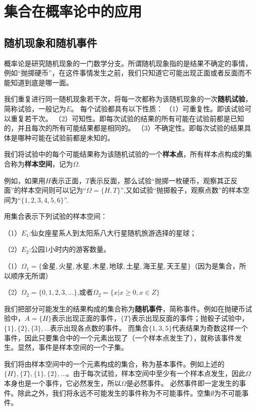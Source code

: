\section{集合在概率论中的应用}
\subsection{随机现象和随机事件}
概率论是研究随机现象的一门数学分支。所谓随机现象指的是结果不确定的事情，例如“抛掷硬币”，在这件事情发生之前，我们只知道它可能出现正面或者反面而不能知道到底是哪一面。

我们重复进行同一随机现象若干次，将每一次都称为该随机现象的一次\textbf{随机试验}，简称试验，一般记为$E$。
每个试验都具有以下性质：
（1）可重复性。即该试验可以重复若干次。
（2）可知性。即每次试验的结果的所有可能在试验前都是已知的，并且每次的所有可能结果都是相同的。
（3）不确定性。即每次试验的结果具体是哪种可能在试验前都是未知的。

我们将试验中的每个可能结果称为该随机试验的一个\textbf{样本点}，所有样本点构成的集合称为\textbf{样本空间}，记为$\Omega$.

例如，如果用$H$表示正面，$T$表示反面，那么试验“抛掷一枚硬币，观察其正反面”的样本空间则可以记为“$\Omega=\{H,T\}$”,又如试验“抛掷骰子，观察点数”的样本空间为“$\{1,2,3,4,5,6\}$”.

\begin{example}
    用集合表示下列试验的样本空间：
    
    （1）$E_1$:仙女座星系人到太阳系八大行星随机旅游选择的星球；

    （2）$E_2$:公园1小时内的游客数量。
\end{example}
\begin{solution}
    （1）$\Omega_1=\{金星,火星,水星,木星,地球,土星,海王星,天王星\}$（因为是集合，所以顺序无所谓）

    （2）$\Omega_2=\{0,1,2,3,...\}$,或者$\Omega_2=\{x|x \geq 0 , x \in Z\}$
\end{solution}

我们把部分可能发生的结果构成的集合称为\textbf{随机事件}，简称事件。例如在抛硬币试验中，$A=\{H\}$表示出现正面的事件，$\{T\}$表示出现反面的事件；抛骰子试验中，$\{1\},\{2\},\{3\},...$表示出现各点数的事件。
而集合$\{1,3,5\}$代表结果为奇数这样一个事件，因此只要集合中的一个元素出现了（一个样本点发生了），就称该事件发生。显然，事件是样本空间的一个子集。

我们将由样本空间中的一个元素构成的集合，称为基本事件。例如上述的$\{H\},\{T\},\{1\},\{2\},...$。由于每次试验，样本空间中至少有一个样本点发生，因此$\Omega$本身也是一个事件，它必然发生，所以$\Omega$是必然事件。
必然事件即一定发生的事件。除此之外，我们将永远不可能发生的事件称为不可能事件。空集$\emptyset$为不可能事件。

